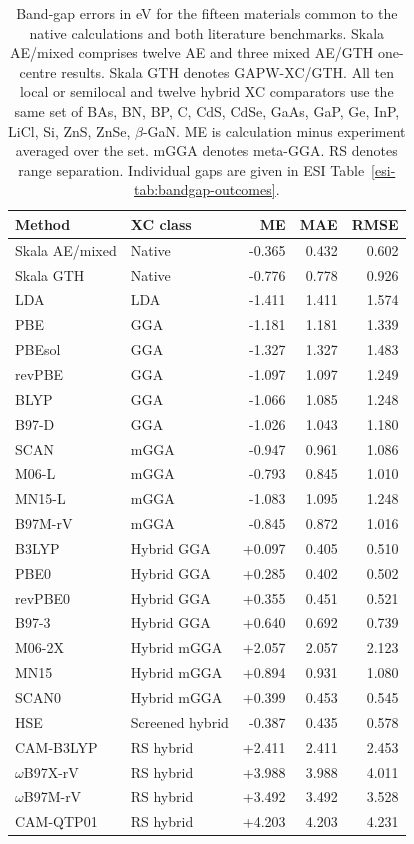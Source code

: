 \documentclass[10pt,a4paper,twocolumn]{article}
\begin{document}
\begin{table}[tb]
\centering\small
\setlength{\tabcolsep}{2.5pt}
\caption{Band-gap errors in eV for the fifteen materials common to the native calculations and both literature benchmarks.\cite{Lee2021Gaps,Lee2022Hybrids} Skala AE/mixed comprises twelve AE and three mixed AE/GTH one-centre results. Skala GTH denotes GAPW-XC/GTH. All ten local or semilocal and twelve hybrid XC comparators use the same set of BAs, BN, BP, C, CdS, CdSe, GaAs, GaP, Ge, InP, LiCl, Si, ZnS, ZnSe, $\beta$-GaN. ME is calculation minus experiment averaged over the set. mGGA denotes meta-GGA. RS denotes range separation. Individual gaps are given in ESI Table~\ref{esi-tab:bandgap-outcomes}.}
\label{tab:bandgap-method-errors}
\begin{tabular}{@{}llrrr@{}}
\toprule
Method & XC class & ME & MAE & RMSE \\
\midrule
Skala AE/mixed & Native & -0.365 & 0.432 & 0.602 \\
Skala GTH & Native & -0.776 & 0.778 & 0.926 \\
\midrule
LDA & LDA & -1.411 & 1.411 & 1.574 \\
PBE & GGA & -1.181 & 1.181 & 1.339 \\
PBEsol & GGA & -1.327 & 1.327 & 1.483 \\
revPBE & GGA & -1.097 & 1.097 & 1.249 \\
BLYP & GGA & -1.066 & 1.085 & 1.248 \\
B97-D & GGA & -1.026 & 1.043 & 1.180 \\
SCAN & mGGA & -0.947 & 0.961 & 1.086 \\
M06-L & mGGA & -0.793 & 0.845 & 1.010 \\
MN15-L & mGGA & -1.083 & 1.095 & 1.248 \\
B97M-rV & mGGA & -0.845 & 0.872 & 1.016 \\
\midrule
B3LYP & Hybrid GGA & +0.097 & 0.405 & 0.510 \\
PBE0 & Hybrid GGA & +0.285 & 0.402 & 0.502 \\
revPBE0 & Hybrid GGA & +0.355 & 0.451 & 0.521 \\
B97-3 & Hybrid GGA & +0.640 & 0.692 & 0.739 \\
M06-2X & Hybrid mGGA & +2.057 & 2.057 & 2.123 \\
MN15 & Hybrid mGGA & +0.894 & 0.931 & 1.080 \\
SCAN0 & Hybrid mGGA & +0.399 & 0.453 & 0.545 \\
HSE & Screened hybrid & -0.387 & 0.435 & 0.578 \\
CAM-B3LYP & RS hybrid & +2.411 & 2.411 & 2.453 \\
$\omega$B97X-rV & RS hybrid & +3.988 & 3.988 & 4.011 \\
$\omega$B97M-rV & RS hybrid & +3.492 & 3.492 & 3.528 \\
CAM-QTP01 & RS hybrid & +4.203 & 4.203 & 4.231 \\
\bottomrule
\end{tabular}
\end{table}
\end{document}
